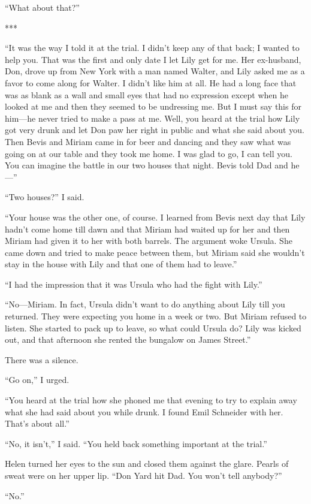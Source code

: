 \documentclass{novel}
\begin{document}
{“What about that?”

***

“It was the way I told it at the trial. I didn’t keep any of that back; I wanted to help you. That was the first and only date I let Lily get for me. Her ex-husband, Don, drove up from New York with a man named Walter, and Lily asked me as a favor to come along for Walter. I didn’t like him at all. He had a long face that was as blank as a wall and small eyes that had no expression except when he looked at me and then they seemed to be undressing me. But I must say this for him—he never tried to make a pass at me. Well, you heard at the trial how Lily got very drunk and let Don paw her right in public and what she said about you. Then Bevis and Miriam came in for beer and dancing and they saw what was going on at our table and they took me home. I was glad to go, I can tell you. You can imagine the battle in our two houses that night. Bevis told Dad and he—”

“Two houses?” I said.

“Your house was the other one, of course. I learned from Bevis next day that Lily hadn’t come home till dawn and that Miriam had waited up for her and then Miriam had given it to her with both barrels. The argument woke Ursula. She came down and tried to make peace between them, but Miriam said she wouldn’t stay in the house with Lily and that one of them had to leave.”

“I had the impression that it was Ursula who had the fight with Lily.”

“No—Miriam. In fact, Ursula didn’t want to do anything about Lily till you returned. They were expecting you home in a week or two. But Miriam refused to listen. She started to pack up to leave, so what could Ursula do? Lily was kicked out, and that afternoon she rented the bungalow on James Street.”

There was a silence.

“Go on,” I urged.

“You heard at the trial how she phoned me that evening to try to explain away what she had said about you while drunk. I found Emil Schneider with her. That’s about all.”

“No, it isn’t,” I said. “You held back something important at the trial.”

Helen turned her eyes to the sun and closed them against the glare. Pearls of sweat were on her upper lip. “Don Yard hit Dad. You won’t tell anybody?”

“No.”

}
\end{document}
